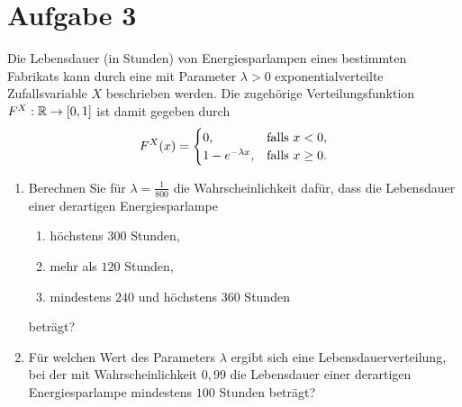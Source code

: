 \documentclass{exercise}
\begin{document}
    \section*{Aufgabe 3}

    \begin{problem}
        Die Lebensdauer (in Stunden) von Energiesparlampen eines bestimmten Fabrikats kann durch eine mit Parameter \(\lambda > 0\) exponentialverteilte Zufallsvariable \(X\) beschrieben werden.
        Die zugehörige Verteilungsfunktion \(F^X: \R \to \brackets*{0, 1}\) ist damit gegeben durch
        \[
            F^X\parentheses*{x} = \begin{cases}
                0, &\text{falls }x < 0,\\
                1 - e^{-\lambda x}, & \text{falls }x \ge 0.
            \end{cases}
        \]
        \begin{enumerate}
            \item Berechnen Sie für \(\lambda = \frac{1}{800}\) die Wahrscheinlichkeit dafür, dass die Lebensdauer einer derartigen Energiesparlampe
            \begin{enumerate}
                \item höchstens \(300\) Stunden,
                \item mehr als \(120\) Stunden,
                \item mindestens \(240\) und höchstens \(360\) Stunden
            \end{enumerate}
            beträgt?
            \item Für welchen Wert des Parameters \(\lambda\) ergibt sich eine Lebensdauerverteilung, bei der mit Wahrscheinlichkeit \(0,99\) die Lebensdauer einer derartigen Energiesparlampe mindestens \(100\) Stunden beträgt?
        \end{enumerate}
    \end{problem}
\end{document}
